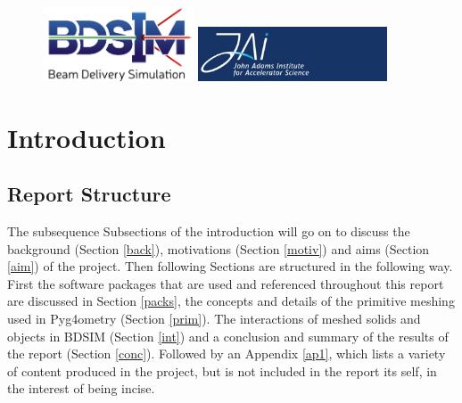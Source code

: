 \documentclass[12pt,a4paper]{article}
\begin{document}
\begin{titlepage}
\begin{figure}[h]
\centering
\begin{minipage}{.6\textwidth}
  \includegraphics[width=0.4\textwidth]{Images//Logos//BDSIM_Logo.jpg}
\end{minipage}%
\begin{minipage}{.6\textwidth}
  \centering
  \includegraphics[width=0.5\textwidth]{Images//Logos//JAI_Logo.jpeg}
  \end{minipage}
\end{figure}

\end{titlepage}
\leavevmode\thispagestyle{empty}\newpage
\tableofcontents
\normalsize
\thispagestyle{empty}
\newpage
\onecolumn

\small
\setcounter{page}{1}


\section{Introduction}

\subsection{Report Structure}
The subsequence Subsections of the introduction will go on to discuss the background (Section \ref{back}), motivations (Section \ref{motiv}) and aims (Section \ref{aim}) of the project. Then following Sections are structured in the following way. First the software packages that are used and referenced throughout this report are discussed in Section \ref{packs}, the concepts and details of the primitive meshing used in Pyg4ometry (Section \ref{prim}). The interactions of meshed solids and objects in BDSIM (Section \ref{int}) and a conclusion and summary of the results of the report (Section \ref{conc}). Followed by an Appendix \ref{ap1}, which lists a variety of content produced in the project, but is not included in the report its self, in the interest of being incise.
\end{document}
